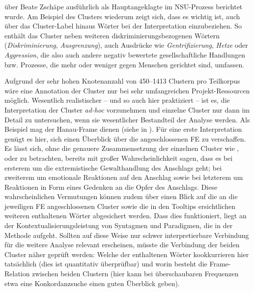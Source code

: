 über Beate Zschäpe ausführlich als Hauptangeklagte im NSU-Prozess berichtet wurde. Am Beispiel des Clusters  wiederum zeigt sich, dass es wichtig ist, auch über das Cluster-Label hinaus Wörter bei der Interpretation einzubeziehen. So enthält das Cluster neben weiteren diskriminierungsbezogenen Wörtern (\emph{Diskriminierung}, \emph{Ausgrenzung}), auch Ausdrücke wie \emph{Gentrifizierung}, \emph{Hetze} oder \emph{Aggression}, die also auch andere negativ bewertete gesellschaftliche Handlungen bzw. Prozesse, die mehr oder weniger gegen Menschen gerichtet sind, umfassen.

Aufgrund der sehr hohen Knotenanzahl von 450--1413 Clustern pro Teilkorpus wäre eine Annotation der Cluster nur bei sehr umfangreichen Projekt-Ressourcen möglich. Wesentlich realistischer -- und so auch hier praktiziert -- ist es, die Interpretation der Cluster \emph{ad-hoc} vorzunehmen und einzelne Cluster nur dann im Detail zu untersuchen, wenn sie wesentlicher Bestandteil der Analyse werden. Als Beispiel mag der Hanau-Frame dienen (siehe  in ). Für eine erste Interpretation genügt es hier, sich einen Überblick über die angeschlossenen FE zu verschaffen. Es lässt sich, ohne die genauere Zusammensetzung der einzelnen Cluster wie ,  oder  zu betrachten, bereits mit großer Wahrscheinlichkeit sagen, dass es bei ersterem um die extremistische Gewalthandlung des Anschlags geht; bei zweiterem um emotionale Reaktionen auf den Anschlag sowie bei letzterem um Reaktionen in Form eines Gedenken an die Opfer des Anschlags. Diese wahrscheinlichen Vermutungen können zudem über einen Blick auf die an die jeweiligen FE angeschlossenen Cluster sowie die in den Tooltips ersichtlichen weiteren enthaltenen Wörter abgesichert werden. Dass dies funktioniert, liegt an der Kontextualisierungsleistung von Syntagmen und Paradigmen, die in der Methode aufgeht. Sollten auf diese Weise nur schwer interpretierbare Verbindung für die weitere Analyse relevant erscheinen, müsste die Verbindung der beiden Cluster näher geprüft werden: Welche der enthaltenen Wörter kookkurrieren hier tatsächlich (dies ist quantitativ überprüfbar) und worin besteht die Frame-Relation zwischen beiden Clustern (hier kann bei überschaubaren Frequenzen etwa eine Konkordanzsuche einen guten Überblick geben).

